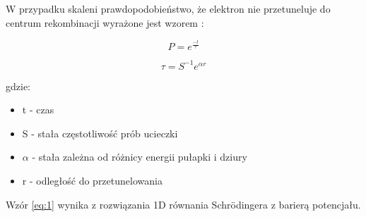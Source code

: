 W przypadku skaleni prawdopodobieństwo, że elektron nie przetuneluje do centrum rekombinacji wyrażone jest wzorem \cite{wzor}:

\begin{equation}
\label{eq:1}
P = e^{\frac{-t}{\tau}}
\end{equation}

\begin{equation}
\label{eq:2}
\tau = S^{-1}e^{\alpha r}
\end{equation}


gdzie:
\begin{itemize}
\item t - czas
\item S - stała częstotliwość prób ucieczki
\item $\alpha$ -  stała zależna od różnicy energii pułapki i dziury
\item r - odległość do przetunelowania
\end{itemize}

Wzór \ref{eq:1} wynika z rozwiązania 1D równania Schrödingera z barierą potencjału.





